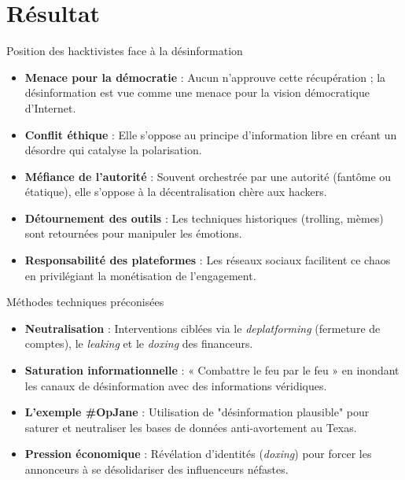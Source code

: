 \documentclass[10pt, french]{beamer}
\begin{document}
\section{Résultat}

\begin{frame}{Position des hacktivistes face à la désinformation}
\begin{itemize}
	\item \textbf{Menace pour la démocratie} : Aucun n'approuve cette récupération ; la désinformation est vue comme une menace pour la vision démocratique d'Internet.
  \item \textbf{Conflit éthique} : Elle s'oppose au principe d'information libre en créant un désordre qui catalyse la polarisation.
  \item \textbf{Méfiance de l'autorité} : Souvent orchestrée par une autorité (fantôme ou étatique), elle s'oppose à la décentralisation chère aux hackers.
  \item \textbf{Détournement des outils} : Les techniques historiques (trolling, mèmes) sont retournées pour manipuler les émotions.
  \item \textbf{Responsabilité des plateformes} : Les réseaux sociaux facilitent ce chaos en privilégiant la monétisation de l'engagement.
\end{itemize}
\end{frame}

\begin{frame}{Méthodes techniques préconisées}
\begin{itemize}
	\item \textbf{Neutralisation} : Interventions ciblées via le \textit{deplatforming} (fermeture de comptes), le \textit{leaking} et le \textit{doxing} des financeurs.
  \item \textbf{Saturation informationnelle} : « Combattre le feu par le feu » en inondant les canaux de désinformation avec des informations véridiques.
  \item \textbf{L'exemple \#OpJane} : Utilisation de "désinformation plausible" pour saturer et neutraliser les bases de données anti-avortement au Texas.
  \item \textbf{Pression économique} : Révélation d'identités (\textit{doxing}) pour forcer les annonceurs à se désolidariser des influenceurs néfastes.
\end{itemize}
\end{frame}
\end{document}
